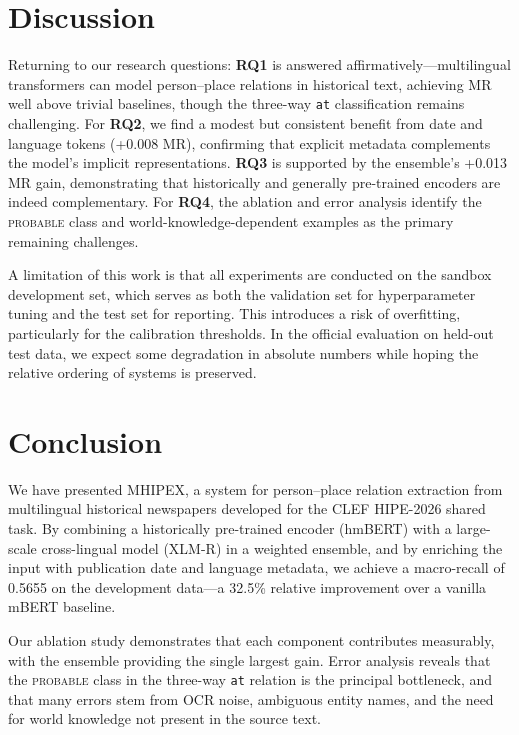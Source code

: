 \section{Discussion}
\label{sec:discussion}

Returning to our research questions: \textbf{RQ1} is answered affirmatively---multilingual transformers can model person--place relations in historical text, achieving MR well above trivial baselines, though the three-way \texttt{at} classification remains challenging. For \textbf{RQ2}, we find a modest but consistent benefit from date and language tokens (+0.008 MR), confirming that explicit metadata complements the model's implicit representations. \textbf{RQ3} is supported by the ensemble's +0.013 MR gain, demonstrating that historically and generally pre-trained encoders are indeed complementary. For \textbf{RQ4}, the ablation and error analysis identify the \textsc{probable} class and world-knowledge-dependent examples as the primary remaining challenges.

A limitation of this work is that all experiments are conducted on the sandbox development set, which serves as both the validation set for hyperparameter tuning and the test set for reporting. This introduces a risk of overfitting, particularly for the calibration thresholds. In the official evaluation on held-out test data, we expect some degradation in absolute numbers while hoping the relative ordering of systems is preserved.

\section{Conclusion}
\label{sec:conclusion}

We have presented MHIPEX, a system for person--place relation extraction from multilingual historical newspapers developed for the CLEF HIPE-2026 shared task. By combining a historically pre-trained encoder (hmBERT) with a large-scale cross-lingual model (XLM-R) in a weighted ensemble, and by enriching the input with publication date and language metadata, we achieve a macro-recall of 0.5655 on the development data---a 32.5\% relative improvement over a vanilla mBERT baseline.

Our ablation study demonstrates that each component contributes measurably, with the ensemble providing the single largest gain. Error analysis reveals that the \textsc{probable} class in the three-way \texttt{at} relation is the principal bottleneck, and that many errors stem from OCR noise, ambiguous entity names, and the need for world knowledge not present in the source text.

